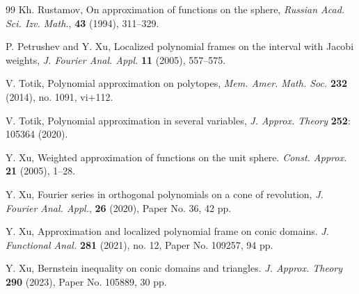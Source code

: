 \documentclass{amsart}
\theoremstyle{remark}
\begin{document}
\begin{thebibliography}{99}
         Kh. Rustamov,
         On approximation of functions on the sphere,
         \textit{Russian Acad. Sci. Izv. Math.}, \textbf{43} (1994), 311--329.

         P. Petrushev and Y. Xu, 
         Localized polynomial frames on the interval with Jacobi weights, 
         \textit{J. Fourier Anal. Appl.} \textbf{11} (2005), 557--575.        

       V. Totik, 
       Polynomial approximation on polytopes, 
       {\it Mem. Amer. Math. Soc.} \textbf{232} (2014), no. 1091, vi+112.
 
       V. Totik,  
       Polynomial approximation in several variables, 
       \textit{J. Approx. Theory} \textbf{252}: 105364 (2020).
       

         Y. Xu,
         Weighted approximation of functions on the unit sphere.
         \textit{Const. Approx.} \textbf{21} (2005), 1--28. 
      
         Y. Xu, 
         Fourier series in orthogonal polynomials on a cone of revolution,
         \textit{J. Fourier Anal. Appl.}, \textbf{26} (2020), Paper No. 36, 42 pp.
        
         Y. Xu,
         Approximation and localized polynomial frame on conic domains. 
        \textit{J. Functional Anal.} \textbf{281} (2021), no. 12, Paper No. 109257, 94 pp.
        
         Y. Xu,  
         Bernstein inequality on conic domains and triangles. 
         \textit{J. Approx. Theory} \textbf{290} (2023), Paper No. 105889, 30 pp.
 
\end{thebibliography}




 

 



 
\end{document}
